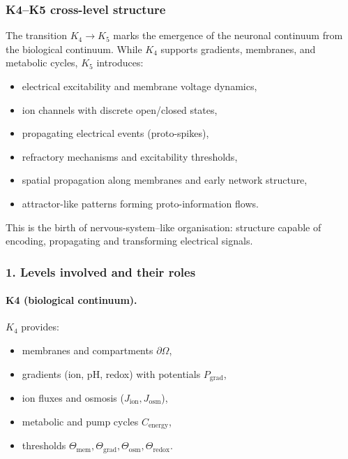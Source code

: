 
\subsubsection{K4–K5 cross-level structure}
\label{sec:crossk-k4-k5}

The transition $K_4 \rightarrow K_5$ marks the emergence of the neuronal
continuum from the biological continuum. While $K_4$ supports gradients,
membranes, and metabolic cycles, $K_5$ introduces:
\begin{itemize}
  \item electrical excitability and membrane voltage dynamics,
  \item ion channels with discrete open/closed states,
  \item propagating electrical events (proto-spikes),
  \item refractory mechanisms and excitability thresholds,
  \item spatial propagation along membranes and early network structure,
  \item attractor-like patterns forming proto-information flows.
\end{itemize}

This is the birth of nervous-system–like organisation: structure capable of
encoding, propagating and transforming electrical signals.

\subsubsection{1. Levels involved and their roles}

\paragraph{K4 (biological continuum).}
$K_4$ provides:
\begin{itemize}
  \item membranes and compartments $\partial\Omega$,
  \item gradients (ion, pH, redox) with potentials $P_{\mathrm{grad}}$,
  \item ion fluxes and osmosis ($J_{\mathrm{ion}}, J_{\mathrm{osm}}$),
  \item metabolic and pump cycles $C_{\mathrm{energy}}$,
  \item thresholds $\Theta_{\mathrm{mem}}, \Theta_{\mathrm{grad}},
        \Theta_{\mathrm{osm}}, \Theta_{\mathrm{redox}}$.
\end{itemize}

